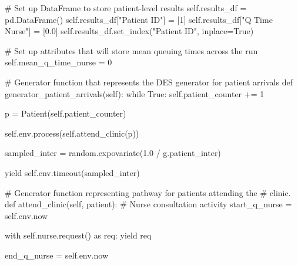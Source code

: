 \documentclass[
  letterpaper,
  DIV=11,
  numbers=noendperiod]{scrreprt}
\newenvironment{Shaded}{}{}
\newcommand{\CommentTok}[1]{\textcolor[rgb]{0.42,0.45,0.49}{#1}}
\newcommand{\ControlFlowTok}[1]{\textcolor[rgb]{0.84,0.23,0.29}{#1}}
\newcommand{\DecValTok}[1]{\textcolor[rgb]{0.00,0.36,0.77}{#1}}
\newcommand{\FloatTok}[1]{\textcolor[rgb]{0.00,0.36,0.77}{#1}}
\newcommand{\ImportTok}[1]{\textcolor[rgb]{0.01,0.18,0.38}{#1}}
\newcommand{\KeywordTok}[1]{\textcolor[rgb]{0.84,0.23,0.29}{#1}}
\newcommand{\NormalTok}[1]{\textcolor[rgb]{0.14,0.16,0.18}{#1}}
\newcommand{\OperatorTok}[1]{\textcolor[rgb]{0.14,0.16,0.18}{#1}}
\newcommand{\StringTok}[1]{\textcolor[rgb]{0.01,0.18,0.38}{#1}}
\newcommand{\VariableTok}[1]{\textcolor[rgb]{0.89,0.38,0.04}{#1}}
\begin{document}
\begin{Shaded}
\begin{Highlighting}[]
        \CommentTok{\# Set up DataFrame to store patient{-}level results}
        \VariableTok{self}\NormalTok{.results\_df }\OperatorTok{=}\NormalTok{ pd.DataFrame()}
        \VariableTok{self}\NormalTok{.results\_df[}\StringTok{"Patient ID"}\NormalTok{] }\OperatorTok{=}\NormalTok{ [}\DecValTok{1}\NormalTok{]}
        \VariableTok{self}\NormalTok{.results\_df[}\StringTok{"Q Time Nurse"}\NormalTok{] }\OperatorTok{=}\NormalTok{ [}\FloatTok{0.0}\NormalTok{]}
        \VariableTok{self}\NormalTok{.results\_df.set\_index(}\StringTok{"Patient ID"}\NormalTok{, inplace}\OperatorTok{=}\VariableTok{True}\NormalTok{)}

        \CommentTok{\# Set up attributes that will store mean queuing times across the run}
        \VariableTok{self}\NormalTok{.mean\_q\_time\_nurse }\OperatorTok{=} \DecValTok{0}

    \CommentTok{\# Generator function that represents the DES generator for patient arrivals}
    \KeywordTok{def}\NormalTok{ generator\_patient\_arrivals(}\VariableTok{self}\NormalTok{):}
        \ControlFlowTok{while} \VariableTok{True}\NormalTok{:}
            \VariableTok{self}\NormalTok{.patient\_counter }\OperatorTok{+=} \DecValTok{1}

\NormalTok{            p }\OperatorTok{=}\NormalTok{ Patient(}\VariableTok{self}\NormalTok{.patient\_counter)}

            \VariableTok{self}\NormalTok{.env.process(}\VariableTok{self}\NormalTok{.attend\_clinic(p))}

\NormalTok{            sampled\_inter }\OperatorTok{=}\NormalTok{ random.expovariate(}\FloatTok{1.0} \OperatorTok{/}\NormalTok{ g.patient\_inter)}

            \ControlFlowTok{yield} \VariableTok{self}\NormalTok{.env.timeout(sampled\_inter)}

    \CommentTok{\# Generator function representing pathway for patients attending the}
    \CommentTok{\# clinic.}
    \KeywordTok{def}\NormalTok{ attend\_clinic(}\VariableTok{self}\NormalTok{, patient):}
        \CommentTok{\# Nurse consultation activity}
\NormalTok{        start\_q\_nurse }\OperatorTok{=} \VariableTok{self}\NormalTok{.env.now}

        \ControlFlowTok{with} \VariableTok{self}\NormalTok{.nurse.request() }\ImportTok{as}\NormalTok{ req:}
            \ControlFlowTok{yield}\NormalTok{ req}

\NormalTok{            end\_q\_nurse }\OperatorTok{=} \VariableTok{self}\NormalTok{.env.now}


\end{Highlighting}
\end{Shaded}
\end{document}
